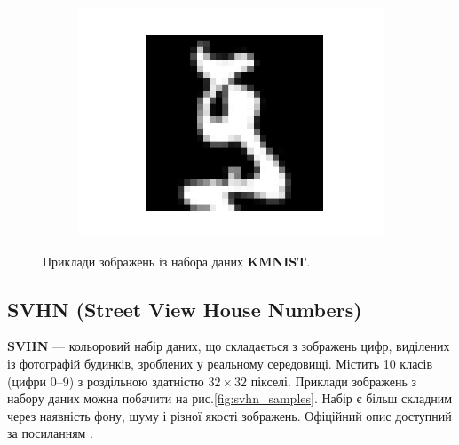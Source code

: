 \documentclass[14pt,a4paper]{extarticle}
\begin{document}
\begin{figure}[htb]
\begin{subfigure}[b]{0.3\textwidth}
    \includegraphics[width=\textwidth]{../res/kmnist/sample_8.png}
    \label{fig:kmnist_sample_8}
  \end{subfigure}
  
  \caption{Приклади зображень із набора даних \textbf{KMNIST}.}
  \label{fig:kmnist_samples}
\end{figure}

\subsection{SVHN (Street View House Numbers)}
\textbf{SVHN} --- кольоровий набір даних, що складається з зображень цифр, виділених із фотографій будинків, зроблених у реальному середовищі. Містить 10 класів (цифри 0–9) з роздільною здатністю $32 \times 32$ пікселі. Приклади зображень з набору даних можна побачити на рис.\ref{fig:svhn_samples}. Набір є більш складним через наявність фону, шуму і різної якості зображень. Офіційний опис доступний за посиланням \cite{svhn}.
\end{document}
